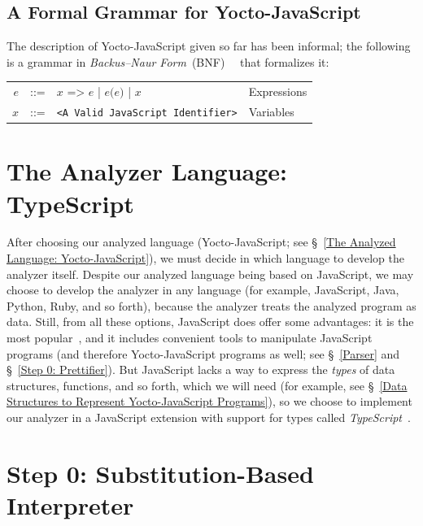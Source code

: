 \documentclass[12pt, oneside]{book}
\begin{document}
\begin{mdframed}[frametitle = {Advanced}]
\subsection{A Formal Grammar for Yocto-JavaScript}
\label{A Formal Grammar for Yocto-JavaScript}

The description of Yocto-JavaScript given so far has been informal; the following is a grammar in \emph{Backus–Naur Form}~(BNF)~\cite{bnf}~\cite[§~4.2]{dragon-book} that formalizes it:

\begin{center}
\begin{tabular}{rcll}
$e$ & ::= & $x\texttt{ => }e$ | $e\texttt{(}e\texttt{)}$ | $x$ & Expressions \\
$x$ & ::= & \texttt{<A Valid JavaScript Identifier>} & Variables \\
\end{tabular}
\end{center}

\end{mdframed}

\section{The Analyzer Language: TypeScript}
\label{The Analyzer Language: TypeScript}

After choosing our analyzed language (Yocto-JavaScript; see §~\ref{The Analyzed Language: Yocto-JavaScript}), we must decide in which language to develop the analyzer itself. Despite our analyzed language being based on JavaScript, we may choose to develop the analyzer in any language (for example, JavaScript, Java, Python, Ruby, and so forth), because the analyzer treats the analyzed program as data. Still, from all these options, JavaScript does offer some advantages: it is the most popular~\cite{stack-overflow-developer-survey, jet-brains-developer-survey}, and it includes convenient tools to manipulate JavaScript programs (and therefore Yocto-JavaScript programs as well; see §~\ref{Parser} and §~\ref{Step 0: Prettifier}). But JavaScript lacks a way to express the \emph{types} of data structures, functions, and so forth, which we will need (for example, see §~\ref{Data Structures to Represent Yocto-JavaScript Programs}), so we choose to implement our analyzer in a JavaScript extension with support for types called \emph{TypeScript}~\cite{typescript, typescript-deep-dive, understanding-typescript}.

\section{Step 0: Substitution-Based Interpreter}
\label{Step 0: Substitution-Based Interpreter}
\end{document}
